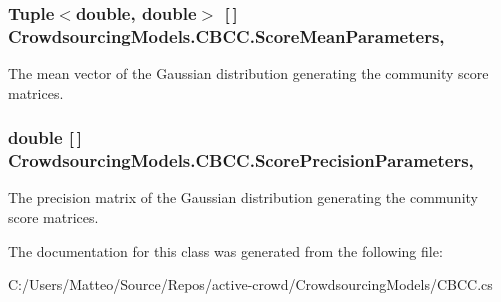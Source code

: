 \hypertarget{class_crowdsourcing_models_1_1_c_b_c_c_a8ef0b4450b90f90056b63b9e91d0e019}{}
\subsubsection[{Score\+Mean\+Parameters}]{\setlength{\rightskip}{0pt plus 5cm}Tuple$<$double, double$>$ \mbox{[}$\,$\mbox{]} Crowdsourcing\+Models.\+C\+B\+C\+C.\+Score\+Mean\+Parameters\hspace{0.3cm}{\ttfamily [get]}, {\ttfamily [set]}}\label{class_crowdsourcing_models_1_1_c_b_c_c_a8ef0b4450b90f90056b63b9e91d0e019}


The mean vector of the Gaussian distribution generating the community score matrices. 

\hypertarget{class_crowdsourcing_models_1_1_c_b_c_c_ac7e4f6e87b9a0da08b4ef2c5c55887ed}{}
\subsubsection[{Score\+Precision\+Parameters}]{\setlength{\rightskip}{0pt plus 5cm}double \mbox{[}$\,$\mbox{]} Crowdsourcing\+Models.\+C\+B\+C\+C.\+Score\+Precision\+Parameters\hspace{0.3cm}{\ttfamily [get]}, {\ttfamily [set]}}\label{class_crowdsourcing_models_1_1_c_b_c_c_ac7e4f6e87b9a0da08b4ef2c5c55887ed}


The precision matrix of the Gaussian distribution generating the community score matrices. 



The documentation for this class was generated from the following file\+:\begin{DoxyCompactItemize}
\item 
C\+:/\+Users/\+Matteo/\+Source/\+Repos/active-\/crowd/\+Crowdsourcing\+Models/C\+B\+C\+C.\+cs\end{DoxyCompactItemize}
